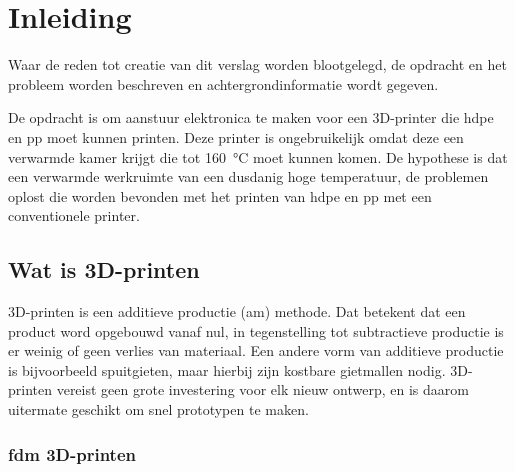 \chapter{Inleiding}
\label{inleiding}

\begin{center}
    \begin{minipage}{0.5\textwidth}
        \begin{small}
            Waar de reden tot creatie van dit verslag worden blootgelegd, de
            opdracht en het probleem worden beschreven en achtergrondinformatie
            wordt gegeven.
        \end{small}
    \end{minipage}
    \vspace{0.5cm}
\end{center}

\noindent De opdracht is om aanstuur elektronica te maken voor een 3D-printer
die \ac{hdpe} en \ac{pp} moet kunnen printen. Deze printer is ongebruikelijk
omdat deze een verwarmde kamer krijgt die tot \SI{160}{\celsius} moet kunnen
komen. De hypothese is dat een verwarmde werkruimte van een dusdanig hoge
temperatuur, de problemen oplost die worden bevonden met het printen van
\ac{hdpe} en \ac{pp} met een conventionele printer.

\section{Wat is 3D-printen}

3D-printen is een additieve productie (\ac{am}) methode. Dat betekent dat een
product word opgebouwd vanaf nul, in tegenstelling tot subtractieve productie
is er weinig of geen verlies van materiaal.  Een andere vorm van additieve
productie is bijvoorbeeld spuitgieten, maar hierbij zijn kostbare gietmallen
nodig. 3D-printen vereist geen grote investering voor elk nieuw ontwerp, en is
daarom uitermate geschikt om snel prototypen te maken. \cite{ATTARAN2017677}

\subsection{\ac{fdm} 3D-printen}

